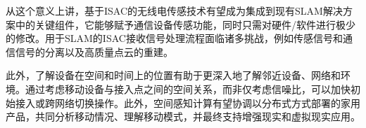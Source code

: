 从这个意义上讲，基于ISAC的无线电传感技术有望成为集成到现有SLAM解决方案中的关键组件，它能够赋予通信设备传感功能，同时只需对硬件/软件进行极少的修改。用于SLAM的ISAC接收信号处理流程面临诸多挑战，例如传感信号和通信信号的分离以及高质量点云的重建。



此外，了解设备在空间和时间上的位置有助于更深入地了解邻近设备、网络和环境。通过考虑移动设备与接入点之间的空间关系，而非仅考虑信噪比，可以加快初始接入或跨网络切换操作。此外，空间感知计算有望协调以分布式方式部署的家用产品，共同分析移动情况、理解移动模式，并最终支持增强现实和虚拟现实应用。